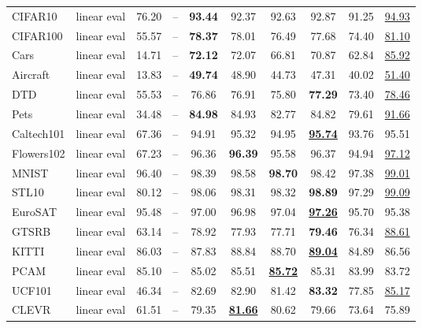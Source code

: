 \documentclass[10pt,twocolumn,letterpaper]{article}
\begin{document}
\begin{table*}[t]
\begin{tabular}{l@{\ }c|ccccccc|c}
CIFAR10 \cite{krizhevsky2009learning} & linear eval & 76.20 & -- & \textbf{93.44} & 92.37 & 92.63 & 92.87 & 91.25 & \underline{94.93} \\
CIFAR100 \cite{krizhevsky2009learning} & linear eval & 55.57 & -- & \textbf{78.37} & 78.01 & 76.49 & 77.68 & 74.40 & \underline{81.10} \\
Cars \cite{KrauseStarkDengFei-Fei_3DRR2013} & linear eval & 14.71 & -- & \textbf{72.12} & 72.07 & 66.81 & 70.87 & 62.84 & \underline{85.92} \\
Aircraft \cite{maji13fine-grained} & linear eval & 13.83 & -- & \textbf{49.74} & 48.90 & 44.73 & 47.31 & 40.02 & \underline{51.40} \\
DTD \cite{cimpoi14describing} & linear eval & 55.53 & -- & 76.86 & 76.91 & 75.80 & \textbf{77.29} & 73.40 & \underline{78.46} \\
Pets \cite{parkhi12a} & linear eval & 34.48 & -- & \textbf{84.98} & 84.93 & 82.77 & 84.82 & 79.61 & \underline{91.66} \\
Caltech101 \cite{FeiFei2004LearningGV} & linear eval & 67.36 & -- & 94.91 & 95.32 & 94.95 & \underline{\textbf{95.74}} & 93.76 & 95.51 \\
Flowers102 \cite{Nilsback08} & linear eval & 67.23 & -- & 96.36 & \textbf{96.39} & 95.58 & 96.37 & 94.94 & \underline{97.12} \\
MNIST \cite{lecun2010mnist} & linear eval & 96.40 & -- & 98.39 & 98.58 & \textbf{98.70} & 98.42 & 97.38 & \underline{99.01} \\
STL10 \cite{coates2011analysis} & linear eval & 80.12 & -- & 98.06 & 98.31 & 98.32 & \textbf{98.89} & 97.29 & \underline{99.09} \\
EuroSAT \cite{helber2019eurosat} & linear eval & 95.48 & -- & 97.00 & 96.98 & 97.04 & \underline{\textbf{97.26}} & 95.70 & 95.38 \\
GTSRB \cite{stallkamp2011german} & linear eval & 63.14 & -- & 78.92 & 77.93 & 77.71 & \textbf{79.46} & 76.34 & \underline{88.61} \\
KITTI \cite{geiger2013vision} & linear eval & 86.03 & -- & 87.83 & 88.84 & 88.70 & \underline{\textbf{89.04}} & 84.89 & 86.56 \\
PCAM \cite{veeling2018rotation} & linear eval & 85.10 & -- & 85.02 & 85.51 & \underline{\textbf{85.72}} & 85.31 & 83.99 & 83.72 \\
UCF101 \cite{soomro2012ucf101} & linear eval & 46.34 & -- & 82.69 & 82.90 & 81.42 & \textbf{83.32} & 77.85 & \underline{85.17} \\
CLEVR \cite{johnson2017clevr} & linear eval & 61.51 & -- & 79.35 & \underline{\textbf{81.66}} & 80.62 & 79.66 & 73.64 & 75.89 \\

\end{tabular}
\end{table*}
\end{document}
